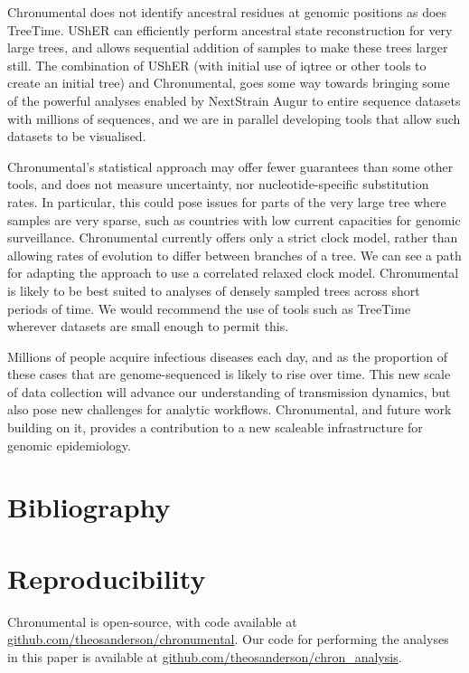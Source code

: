 Chronumental does not identify ancestral residues at genomic positions as does TreeTime. UShER \citep{Turakhia2021-la} can efficiently perform ancestral state reconstruction for very large trees, and allows sequential addition of samples to make these trees larger still. The combination of UShER (with initial use of iqtree \citep{Minh2020-vc} or other tools to create an initial tree) and Chronumental, goes some way towards bringing some of the powerful analyses enabled by NextStrain Augur \citep{Hadfield2018-fb} to entire sequence datasets with millions of sequences, and we are in parallel developing tools \citep{taxonium} that allow such datasets to be visualised.

Chronumental's statistical approach may offer fewer guarantees than some other tools, and does not measure uncertainty, nor nucleotide-specific substitution rates. In particular, this could pose issues for parts of the very large tree where samples are very sparse, such as countries with low current capacities for genomic surveillance. Chronumental currently offers only a strict clock model, rather than allowing rates of evolution to differ between branches of a tree. We can see a path for adapting the approach to use a correlated relaxed clock model. Chronumental is likely to be best suited to analyses of densely sampled trees across short periods of time. We would recommend the use of tools such as TreeTime wherever datasets are small enough to permit this.

Millions of people acquire infectious diseases each day, and as the proportion of these cases that are genome-sequenced is likely to rise over time. This new scale of data collection will advance our understanding of transmission dynamics, but also pose new challenges for analytic workflows. Chronumental, and future work building on it, provides a contribution to a new scaleable infrastructure for genomic epidemiology.






\section*{Bibliography}





\section*{Reproducibility}
Chronumental is open-source, with code available at \url{github.com/theosanderson/chronumental}. Our code for performing the analyses in this paper is available at \url{github.com/theosanderson/chron_analysis}.

